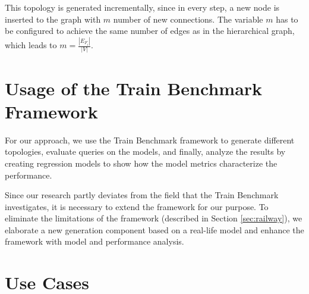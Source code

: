 This topology is generated incrementally, since in every step, a new node is inserted to the graph with $m$ number of new connections. The variable $m$ has to be configured to achieve the same number of edges as in the hierarchical graph, which leads to $m = \frac{|E_{F_i}|}{|V|}$.

\section{Usage of the Train Benchmark Framework}

For our approach, we use the Train Benchmark framework to generate different topologies, evaluate queries on the models, and finally, analyze the results by creating regression models to show how the model metrics characterize the performance.

Since our research partly deviates from the field that the Train Benchmark investigates, it is necessary to extend the framework for our purpose. To eliminate the limitations of the framework (described in Section \ref{sec:railway}), we elaborate a new generation component based on a real-life model and enhance the framework with model and performance analysis.

\section{Use Cases}